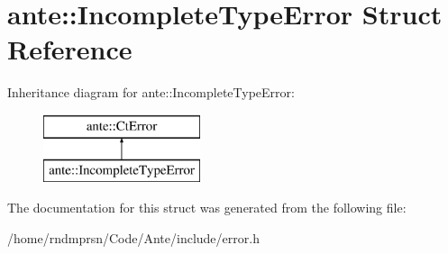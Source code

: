 \hypertarget{structante_1_1IncompleteTypeError}{}\section{ante\+:\+:Incomplete\+Type\+Error Struct Reference}
\label{structante_1_1IncompleteTypeError}
Inheritance diagram for ante\+:\+:Incomplete\+Type\+Error\+:\begin{figure}[H]
\begin{center}
\leavevmode
\includegraphics[height=2.000000cm]{structante_1_1IncompleteTypeError}
\end{center}
\end{figure}


The documentation for this struct was generated from the following file\+:\begin{DoxyCompactItemize}
\item 
/home/rndmprsn/\+Code/\+Ante/include/error.\+h\end{DoxyCompactItemize}
